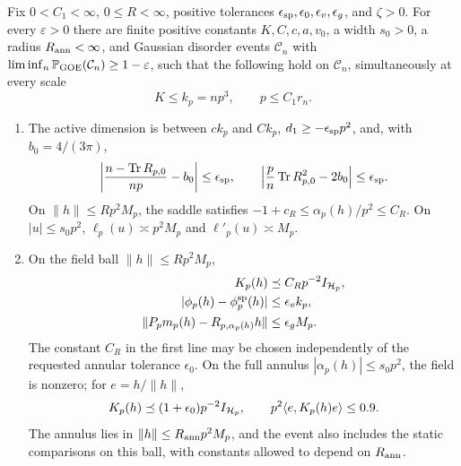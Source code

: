 \begin{proposition}
\label{prop:edge-estimates}
Fix \(0<C_1<\infty\), \(0\le R<\infty\), positive tolerances
\(\epsilon_{\rm sp},\epsilon_0,\epsilon_v,\epsilon_g\), and \(\zeta>0\).
For every \(\varepsilon>0\) there are finite positive constants
\(K,C,c,a,v_0\), a width \(s_0>0\), a radius \(R_{\rm ann}<\infty\),
and Gaussian disorder events
\(\mathcal C_n\) with
\(\liminf_n\mathbb P_{\rm GOE}(\mathcal C_n)\ge1-\varepsilon\), such that
the following hold on \(\mathcal C_n\), simultaneously at every scale
\begin{equation}\label{edge:scale-range}
 K\le k_p=np^3,\qquad p\le C_1r_n.
\end{equation}
\begin{enumerate}
\item The active dimension is between \(ck_p\) and \(Ck_p\),
 \(d_1\ge-\epsilon_{\rm sp}p^2\), and, with \(b_0=4/(3\pi)\),
 \begin{equation}\label{edge:trace-estimates}
 \left|\frac{n-\operatorname{Tr} R_{p,0}}{np}-b_0\right|\le\epsilon_{\rm sp},
 \qquad
 \left|\frac p n\operatorname{Tr} R_{p,0}^2-2b_0\right|\le\epsilon_{\rm sp}.
 \end{equation}
 On \(\|h\|\le Rp^2M_p\), the saddle satisfies
 \(-1+c_R\le\alpha_p(h)/p^2\le C_R\).  On \(|u|\le s_0p^2\),
 \(\ell_p(u)\asymp p^2M_p\) and \(\ell'_p(u)\asymp M_p\).

\item On the field ball \(\|h\|\le Rp^2M_p\),
 \begin{equation}\label{edge:static-estimates}
 \begin{split}
 K_p(h)&\preceq C_Rp^{-2}I_{\mathcal H_p},\\
 |\phi_p(h)-\phi_p^{\rm sp}(h)|&\le\epsilon_v k_p,\\
 \|P_pm_p(h)-R_{p,\alpha_p(h)}h\|&\le\epsilon_gM_p .
 \end{split}
 \end{equation}
 The constant \(C_R\) in the first line may be chosen independently of
 the requested annular tolerance \(\epsilon_0\).
 On the full annulus \(|\alpha_p(h)|\le s_0p^2\), the field is nonzero;
 for \(e=h/\|h\|\),
 \begin{equation}\label{edge:coarse-curvature}
 K_p(h)\preceq(1+\epsilon_0)p^{-2}I_{\mathcal H_p},
 \qquad p^2\langle e,K_p(h)e\rangle\le0.9 .
 \end{equation}
 The annulus lies in \(\|h\|\le R_{\rm ann}p^2M_p\), and the event also
 includes the static comparisons on this ball, with constants allowed
 to depend on \(R_{\rm ann}\).


\end{enumerate}
\end{proposition}

